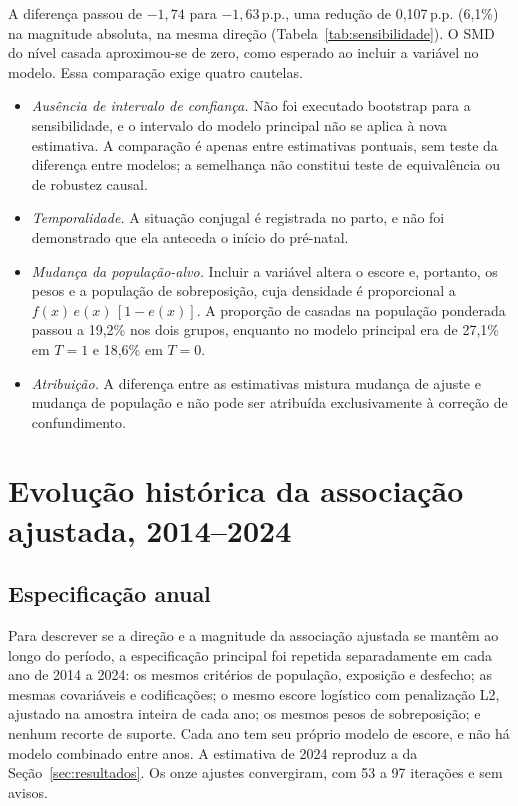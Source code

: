 \documentclass[11pt,a4paper]{article}
\newcommand{\pp}{\,p.p.}
\begin{document}
A diferença passou de $-1{,}74$ para $-1{,}63$\pp, uma redução de 0,107\pp{} (6,1\%) na
magnitude absoluta, na mesma direção (Tabela~\ref{tab:sensibilidade}). O SMD do nível
casada aproximou-se de zero, como esperado ao incluir a variável no modelo. Essa
comparação exige quatro cautelas.

\begin{itemize}
\item \emph{Ausência de intervalo de confiança.} Não foi executado bootstrap para a
sensibilidade, e o intervalo do modelo principal não se aplica à nova estimativa. A
comparação é apenas entre estimativas pontuais, sem teste da diferença entre modelos; a
semelhança não constitui teste de equivalência ou de robustez causal.
\item \emph{Temporalidade.} A situação conjugal é registrada no parto, e não foi
demonstrado que ela anteceda o início do pré-natal.
\item \emph{Mudança da população-alvo.} Incluir a variável altera o escore e, portanto, os
pesos e a população de sobreposição, cuja densidade é proporcional a
$f(x)\,e(x)\,[1-e(x)]$. A proporção de casadas na população ponderada passou a 19,2\% nos
dois grupos, enquanto no modelo principal era de 27,1\% em $T=1$ e 18,6\% em $T=0$.
\item \emph{Atribuição.} A diferença entre as estimativas mistura mudança de ajuste e
mudança de população e não pode ser atribuída exclusivamente à correção de confundimento.
\end{itemize}

\section{Evolução histórica da associação ajustada, 2014--2024}\label{sec:serie}

\subsection{Especificação anual}

Para descrever se a direção e a magnitude da associação ajustada se mantêm ao longo do
período, a especificação principal foi repetida separadamente em cada ano de 2014 a 2024:
os mesmos critérios de população, exposição e desfecho; as mesmas covariáveis e
codificações; o mesmo escore logístico com penalização L2, ajustado na amostra inteira de
cada ano; os mesmos pesos de sobreposição; e nenhum recorte de suporte. Cada ano tem seu
próprio modelo de escore, e não há modelo combinado entre anos. A estimativa de 2024
reproduz a da Seção~\ref{sec:resultados}. Os onze ajustes convergiram, com 53 a 97
iterações e sem avisos.
\end{document}
